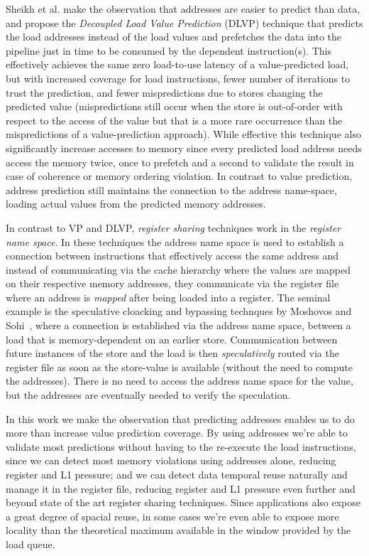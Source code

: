 \documentclass{sig-alternate}
\begin{document}
Sheikh et al. make the observation that addresses are easier to predict than data, and propose the \textit{Decoupled Load Value Prediction} (DLVP) technique that predicts the load addresses instead of the load values and prefetches the data into the pipeline just in time to be consumed by the dependent instruction(s). This effectively achieves the same zero load-to-use latency of a value-predicted load, but with increased coverage for load instructions, fewer number of iterations to trust the prediction, and fewer mispredictions due to stores changing the predicted value (mispredictions still occur when the store is out-of-order with respect to the access of the value but that is a more rare occurrence than the mispredictions of a value-prediction approach).
While effective this technique also significantly increase accesses to memory since every predicted load address needs access the memory twice, once to prefetch and a second to validate the result in case of coherence or memory ordering violation. 
In contrast to value prediction, address prediction still maintains the connection to the address name-space, loading actual values from the predicted memory addresses.

In contrast to VP and DLVP, \emph{register sharing} techniques work in the \emph{register name space}. In these techniques the address name space is used to establish a connection between instructions that effectively access the same address and instead of communicating via the cache hierarchy where the values are mapped on their respective memory addresses, they communicate via the register file where an address is \emph{mapped} after being loaded into a register.
The seminal example is the speculative cloacking and bypassing technques by Moshovos and Sohi~\cite{moshovos98}, where a connection is established via the address name space, between a load that is memory-dependent on an earlier store. Communication between future instances of the store and the load is then \emph{speculatively} routed via the register file as soon as the store-value is available (without the need to compute the addresses). There is no need to access the address name space for the value, but the addresses are eventually needed to verify the speculation. 


In this work we make the observation that predicting addresses enables us to do more than increase value prediction coverage. By using addresses we're able to validate most predictions without having to the re-execute the load instructions, since we can detect most memory violations using addresses alone, reducing register and L1 pressure; and we can detect data temporal reuse naturally and manage it in the register file, reducing register and L1 pressure even further and beyond state of the art register sharing techniques. Since applications also expose a great degree of spacial reuse, in some cases we're even able to expose more locality than the theoretical maximum available in the window provided by the load queue. 
\end{document}
